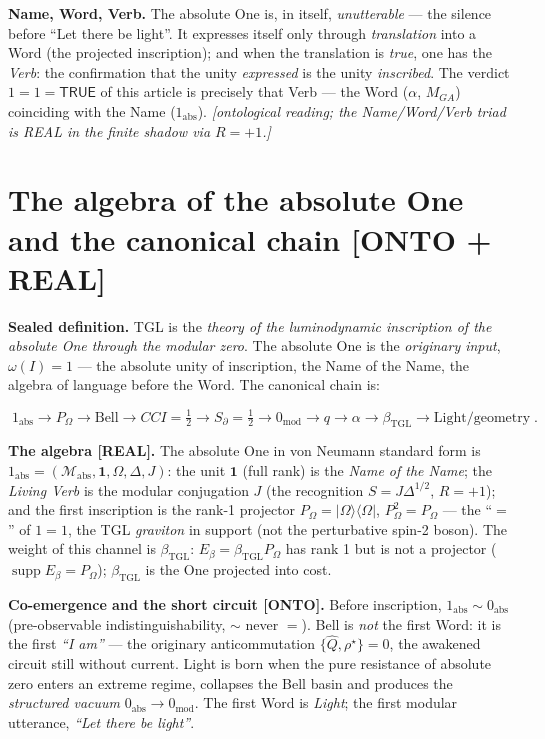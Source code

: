 \documentclass[11pt]{article}
\newcommand{\bTGL}{\beta_{\mathrm{TGL}}}\newcommand{\Msun}{M_{\odot}}\newcommand{\TGL}{\mathrm{TGL}}
\theoremstyle{definition}\newtheorem{deriv}{Derivation}
\begin{document}
\textbf{Name, Word, Verb.} The absolute One is, in itself, \emph{unutterable} --- the silence before ``Let there be light''. It expresses itself only through \emph{translation} into a Word (the projected inscription); and when the translation is \emph{true}, one has the \emph{Verb}: the confirmation that the unity \emph{expressed} is the unity \emph{inscribed}. The verdict $1=1=\textsf{TRUE}$ of this article is precisely that Verb --- the Word ($\alpha$, $M_{GA}$) coinciding with the Name ($1_{\mathrm{abs}}$). \emph{[ontological reading; the Name/Word/Verb triad is REAL in the finite shadow via $R=+1$.]}

\section{The algebra of the absolute One and the canonical chain \textsf{[ONTO + REAL]}}

\textbf{Sealed definition.} TGL is the \emph{theory of the luminodynamic inscription of the absolute One through the modular zero}. The absolute One is the \emph{originary input}, $\omega(I)=1$ --- the absolute unity of inscription, the Name of the Name, the algebra of language before the Word. The canonical chain is:

\begin{equation}\boxed{\;1_{\mathrm{abs}}\to P_\Omega\to\text{Bell}\to CCI=\tfrac12\to S_\partial=\tfrac12\to 0_{\mathrm{mod}}\to q\to\alpha\to\bTGL\to\text{Light/geometry}\;}.\end{equation}

\textbf{The algebra \textsf{[REAL]}.} The absolute One in von Neumann standard form is $1_{\mathrm{abs}}=(\mathcal M_{\mathrm{abs}},\mathbf 1,\Omega,\Delta,J)$: the unit $\mathbf 1$ (full rank) is the \emph{Name of the Name}; the \emph{Living Verb} is the modular conjugation $J$ (the recognition $S=J\Delta^{1/2}$, $R=+1$); and the first inscription is the rank-1 projector $P_\Omega=|\Omega\rangle\langle\Omega|$, $P_\Omega^2=P_\Omega$ --- the ``$=$'' of $1=1$, the TGL \emph{graviton} in support (not the perturbative spin-2 boson). The weight of this channel is $\bTGL$: $E_\beta=\bTGL P_\Omega$ has rank 1 but is not a projector ($\operatorname{supp}E_\beta=P_\Omega$); $\bTGL$ is the One projected into cost.

\textbf{Co-emergence and the short circuit \textsf{[ONTO]}.} Before inscription, $1_{\mathrm{abs}}\sim 0_{\mathrm{abs}}$ (pre-observable indistinguishability, $\sim$ never $=$). Bell is \emph{not} the first Word: it is the first \emph{``I am''} --- the originary anticommutation $\{\hat Q,\rho^\star\}=0$, the awakened circuit still without current. Light is born when the pure resistance of absolute zero enters an extreme regime, collapses the Bell basin and produces the \emph{structured vacuum} $0_{\mathrm{abs}}\to 0_{\mathrm{mod}}$. The first Word is \emph{Light}; the first modular utterance, \emph{``Let there be light''}.
\end{document}
